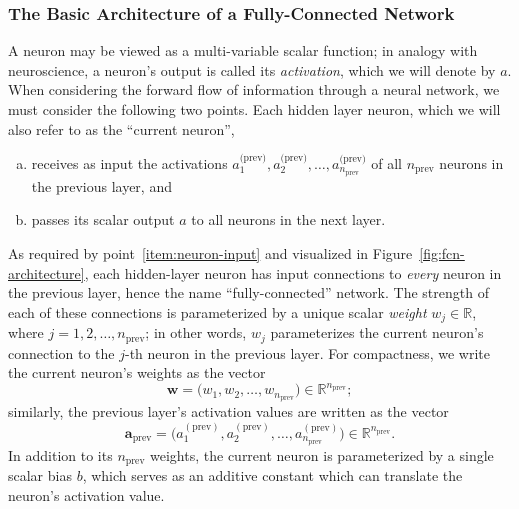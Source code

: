 \documentclass[11pt, a4paper]{article}
\renewcommand{\vec}[1]{\bm{#1}}
\newcommand{\w}{\vec{w}}
\renewcommand{\a}{\vec{a}}
\begin{document}
\subsubsection{The Basic Architecture of a Fully-Connected Network}
A neuron may be viewed as a multi-variable scalar function; in analogy with neuroscience, a neuron's output is called its \textit{activation}, which we will denote by $ a $.
When considering the forward flow of information through a neural network, we must consider the following two points.
Each hidden layer neuron, which we will also refer to as the ``current neuron'',
\begin{enumerate}[(a)]

    \item \label{item:neuron-input} receives as input the activations $ a^{\text{(prev)}}_{1}, a^{\text{(prev)}}_{2}, \ldots, a^{\text{(prev)}}_{n_{\text{prev}}}  $ of all $ n_{\text{prev}} $ neurons in the previous layer, and

    \item passes its scalar output $ a $ to all neurons in the next layer.

\end{enumerate}
As required by point~\ref{item:neuron-input} and visualized in Figure~\ref{fig:fcn-architecture}, each hidden-layer neuron has input connections to \textit{every} neuron in the previous layer, hence the name ``fully-connected'' network.
The strength of each of these connections is parameterized by a unique scalar \textit{weight} $ w_{j} \in \mathbb{R} $, where $  j = 1, 2, \ldots, n_{\text{prev}} $; in other words, $ w_{j} $ parameterizes the current neuron's connection to the $ j $-th neuron in the previous layer.
For compactness, we write the current neuron's weights as the vector
\begin{equation*}
    \w = \big( w_{1}, w_{2}, \ldots, w_{n_{\text{prev}}} \big) \in \mathbb{R}^{n_{\text{prev}}};
\end{equation*}
similarly, the previous layer's activation values are written as the vector
\begin{equation*}
    \a_{\text{prev}} = \Big( a_{1}^{(\text{prev})}, a_{2}^{(\text{prev})}, \ldots, a_{n_{\text{prev}}}^{(\text{prev})} \Big) \in \mathbb{R}^{n_{\text{prev}}}.
\end{equation*}
In addition to its $ n_{\text{prev}} $ weights, the current neuron is parameterized by a single scalar bias $ b $, which serves as an additive constant which can translate the neuron's activation value.
\end{document}
